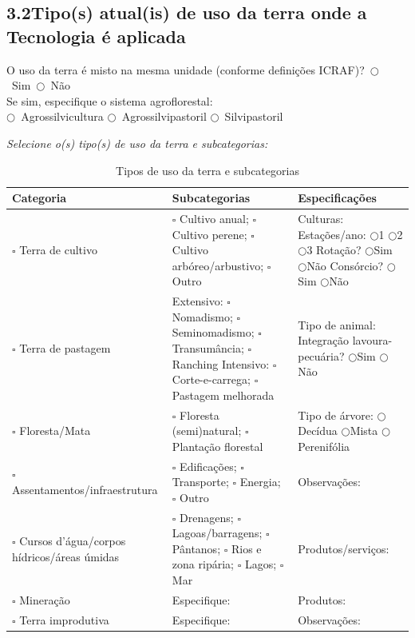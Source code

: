 \subsection{3.2\quad Tipo(s) atual(is) de uso da terra onde a Tecnologia é aplicada}

O uso da terra é misto na mesma unidade (conforme definições ICRAF)?~$\bigcirc$~Sim~$\bigcirc$~Não\\
Se sim, especifique o sistema agroflorestal:\\
$\bigcirc$~Agrossilvicultura \quad $\bigcirc$~Agrossilvipastoril \quad $\bigcirc$~Silvipastoril

\medskip\noindent
\textit{Selecione o(s) tipo(s) de uso da terra e subcategorias:}

\begin{table}[htbp]
\centering\small
\caption{Tipos de uso da terra e subcategorias}
\label{tab:app_land_use}
\begin{tabular}{p{3.2cm}p{5.5cm}p{5.5cm}}
\toprule
\textbf{Categoria} & \textbf{Subcategorias} & \textbf{Especificações} \\
\midrule
$\square$ Terra de cultivo &
  $\square$ Cultivo anual;
  $\square$ Cultivo perene;
  $\square$ Cultivo arbóreo/arbustivo;
  $\square$ Outro &
  Culturas: \dotfill \newline
  Estações/ano: $\bigcirc$1 $\bigcirc$2 $\bigcirc$3 \newline
  Rotação? $\bigcirc$Sim $\bigcirc$Não \newline
  Consórcio? $\bigcirc$Sim $\bigcirc$Não \\
\addlinespace
$\square$ Terra de pastagem &
  Extensivo: $\square$ Nomadismo; $\square$ Seminomadismo; $\square$ Transumância; $\square$ Ranching \newline
  Intensivo: $\square$ Corte-e-carrega; $\square$ Pastagem melhorada &
  Tipo de animal: \dotfill \newline
  Integração lavoura-pecuária? $\bigcirc$Sim $\bigcirc$Não \\
\addlinespace
$\square$ Floresta/Mata &
  $\square$ Floresta (semi)natural; $\square$ Plantação florestal &
  Tipo de árvore: \dotfill \newline
  $\bigcirc$Decídua $\bigcirc$Mista $\bigcirc$Perenifólia \\
\addlinespace
$\square$ Assentamentos/infraestrutura &
  $\square$ Edificações; $\square$ Transporte; $\square$ Energia; $\square$ Outro &
  Observações: \dotfill \\
\addlinespace
$\square$ Cursos d'água/corpos hídricos/áreas úmidas &
  $\square$ Drenagens; $\square$ Lagoas/barragens; $\square$ Pântanos; $\square$ Rios e zona ripária; $\square$ Lagos; $\square$ Mar &
  Produtos/serviços: \dotfill \\
\addlinespace
$\square$ Mineração &
  Especifique: \dotfill &
  Produtos: \dotfill \\
\addlinespace
$\square$ Terra improdutiva &
  Especifique: \dotfill &
  Observações: \dotfill \\
\bottomrule
\end{tabular}
\end{table}

